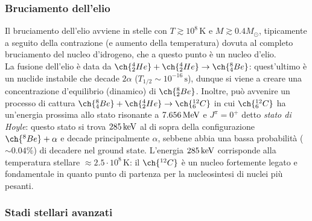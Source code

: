 \subsubsection{Bruciamento dell'elio}

Il bruciamento dell'elio avviene in stelle con $ T \gtrsim 10^8 \,\text{K} $ e $ M \gtrsim 0.4 M_\odot $, tipicamente a seguito della contrazione (e aumento della temperatura) dovuta al completo bruciamento del nucleo d'idrogeno, che a questo punto è un nucleo d'elio.\\
La fusione dell'elio è data da $ \ch{^4_2 He} + \ch{^4_2 He} \rightarrow \ch{^8_4 Be} $: quest'ultimo è un nuclide instabile che decade $ 2\alpha $ ($ T_{1/2} \sim 10^{-16}\,\text{s} $), dunque si viene a creare una concentrazione d'equilibrio (dinamico) di $ \ch{^8_2 Be} $. Inoltre, può avvenire un processo di cattura $ \ch{^8_4 Be} + \ch{^4_2 He} \rightarrow \ch{^{12}_6 C} $ in cui $ \ch{^{12}_6 C} $ ha un'energia prossima allo stato risonante a $ 7.656\,\mathrm{MeV} $ e $ J^\pi = 0^+ $ detto \textit{stato di Hoyle}: questo stato si trova $ 285\,\mathrm{keV} $ al di sopra della configurazione $ \ch{^8 Be} + \alpha $ e decade principalmente $ \alpha $, sebbene abbia una bassa probabilità ($ \sim 0.04\% $) di decadere nel ground state. L'energia $ 285\,\mathrm{keV} $ corrisponde alla temperatura stellare $ \approx 2.5 \cdot 10^8 \,\text{K} $: il $ \ch{^{12} C} $ è un nucleo fortemente legato e fondamentale in quanto punto di partenza per la nucleosintesi di nuclei più pesanti.

\subsubsection{Stadi stellari avanzati}
\label{sec-stell-av}

